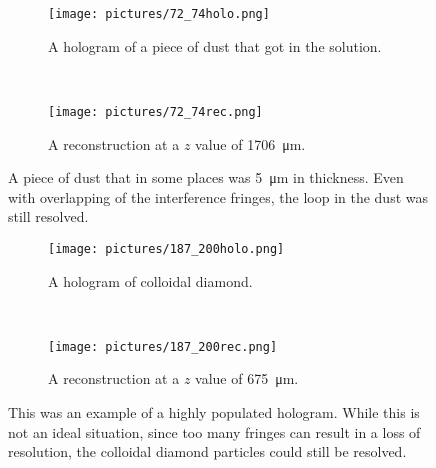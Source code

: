 \begin{figure}[ht!]
    \begin{center}

        \begin{subfigure}[t]{0.4\textwidth}
            \label{fig:72_74holo}
            \texttt{[image: pictures/72\_74holo.png]}
            \caption{A hologram of a piece of dust that got in the solution.}
        \end{subfigure}
        \\
        \begin{subfigure}[t]{\textwidth}
            \label{fig:72_74rec}
            \texttt{[image: pictures/72\_74rec.png]}
            \caption{A reconstruction at a $z$ value of
                \SI{1706}{\micro\meter}.}
        \end{subfigure}


    \end{center}
    \caption{%
        A piece of dust that in some places was \SI{5}{\micro\meter} in
        thickness. Even with overlapping of the interference fringes, the loop in the
        dust was still resolved.
    }%
    \label{fig:72_74}
\end{figure}


\clearpage


\begin{figure}[ht!]
    \begin{center}

        \begin{subfigure}[t]{0.4\textwidth}
            \label{fig:187_200holo}
            \texttt{[image: pictures/187\_200holo.png]}
            \caption{A hologram of colloidal diamond.}
        \end{subfigure}
        \\
        \begin{subfigure}[t]{\textwidth}
            \label{fig:187_200rec}
            \texttt{[image: pictures/187\_200rec.png]}
            \caption{A reconstruction at a $z$ value of \SI{675}{\micro\meter}.}
        \end{subfigure}


    \end{center}
    \caption{%
        This was an example of a highly populated hologram. While this is not
        an ideal situation, since too many fringes can result in a loss of
        resolution, the colloidal diamond particles could still be
        resolved.
    }%
    \label{fig:187_200}
\end{figure}


